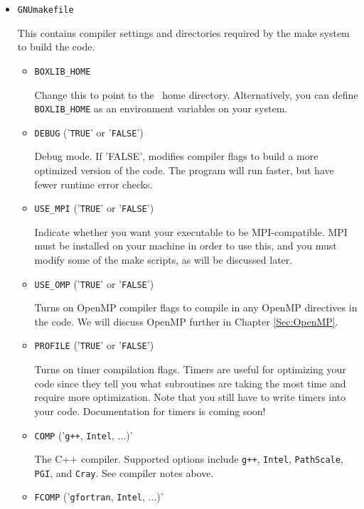 \begin{itemize}
\item {\tt GNUmakefile}

This contains compiler settings and directories required by the make system to build the code.

  \begin{itemize}

    \item {\tt BOXLIB\_HOME}

    Change this to point to the \BoxLib\ home directory.  Alternatively, you can define {\tt BOXLIB\_HOME}
    as an environment variables on your system.

    \item {\tt DEBUG} ('{\tt TRUE}' or '{\tt FALSE}')
      
    Debug mode.  If 'FALSE', modifies compiler flags to build a more optimized version of the code.
    The program will run faster, but have fewer runtime error checks.

    \item {\tt USE\_MPI} ('{\tt TRUE}' or '{\tt FALSE}')

    Indicate whether you want your executable to be MPI-compatible.  MPI must be installed on your
    machine in order to use this, and you must modify some of the make scripts, as will be 
    discussed later.

    \item {\tt USE\_OMP} ('{\tt TRUE}' or '{\tt FALSE}')
    
    Turns on OpenMP compiler flags to compile in any OpenMP directives in the code.
    We will discuss OpenMP further in Chapter \ref{Sec:OpenMP}.

    \item {\tt PROFILE} ('{\tt TRUE}' or '{\tt FALSE}')

    Turns on timer compilation flags.  Timers are useful for optimizing your code since they tell you 
    what subroutines are taking the most time and require more optimization.  Note that you still have 
    to write timers into your code.  Documentation for timers is coming soon!

    \item {\tt COMP} ('{\tt g++}, {\tt Intel}, $\ldots$)'

    The C++ compiler.  Supported options include {\tt g++}, {\tt Intel}, {\tt PathScale}, 
    {\tt PGI}, and {\tt Cray}.  See compiler notes above.

    \item {\tt FCOMP} ('{\tt gfortran}, {\tt Intel}, $\ldots$)'


\end{itemize}
\end{itemize}
